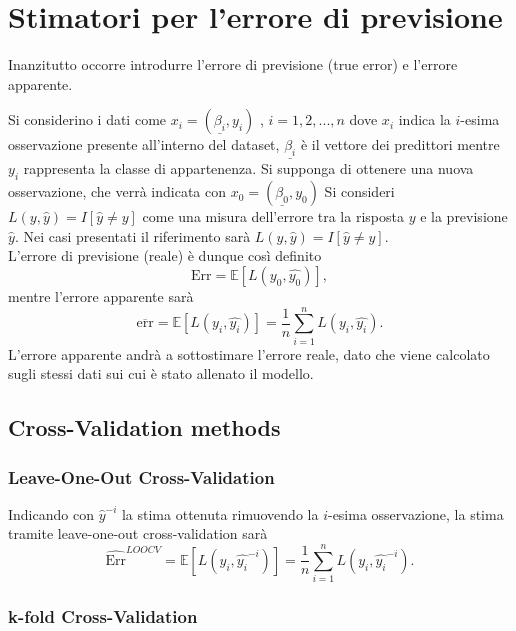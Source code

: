 \chapter{Stimatori per l'errore di previsione}
\label{ch:capitolo5}

Inanzitutto occorre introdurre l'errore di previsione (true error) e l'errore apparente.

Si considerino i dati come $x_i =  (\underline{\beta_i},y_i)$ , $i = 1,2,...,n$ dove $x_i$ indica la $i$-esima osservazione presente all'interno del dataset, $\underline{\beta_i}$ è il vettore dei predittori mentre $y_i$ rappresenta la classe di appartenenza.
Si supponga di ottenere una nuova osservazione, che verrà indicata con $x_0 =  (\underline{\beta_0},y_0)$
Si consideri ${L(y,\hat{y})}=I[\hat{y} \neq y]$ come una misura dell'errore tra la risposta $y$ e la previsione $\hat{y}$. Nei casi presentati il riferimento sarà ${L(y,\hat{y})}=I[\hat{y} \neq y]$. \\
L'errore di previsione (reale) è dunque così definito
\begin{equation}
\text{Err} = \mathbb{E}[L(y_0, \hat{y_0})],
\end{equation}
mentre l'errore apparente sarà
\begin{equation}
\overline{\text{err}} = \mathbb{E}[L(y_i, \hat{y_i})] = \frac{1}{n} \sum_{i=1}^{n} L(y_i, \hat{y_i}).
\end{equation}
L'errore apparente andrà a sottostimare l'errore reale, dato che viene calcolato sugli stessi dati sui cui è stato allenato il modello.

\section{Cross-Validation methods}
\label{sec:sezione5.1}

\subsection{Leave-One-Out Cross-Validation}
\label{sec:sezione5.1.1}

Indicando con $\hat{y}^{-i}$ la stima ottenuta rimuovendo la $i$-esima osservazione, la stima tramite leave-one-out cross-validation sarà
\begin{equation}
\widehat{\text{Err}}^{LOOCV} = \mathbb{E}[L(y_i, \hat{y_i}^{-i})] = \frac{1}{n} \sum_{i=1}^{n} L(y_i, \hat{y_i}^{-i}).
\end{equation}

\subsection{k-fold Cross-Validation}
\label{sec:sezione5.1.2}

